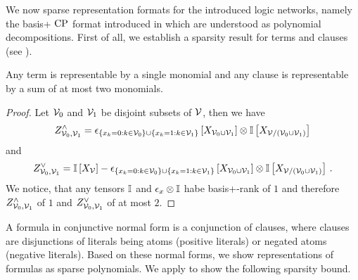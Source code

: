
We now sparse representation formats for the introduced logic networks, namely the basis+ $\mathrm{CP}$ format introduced in  which are understood as polynomial decompositions.
First of all, we establish a sparsity result for terms and clauses (see ).

\begin{lemma}\label{lem:clauseTermBasisPlus}
	Any term is representable by a single monomial and any clause is representable by a sum of at most two monomials. %
\end{lemma}
\begin{proof}
	Let $\mathcal{V}_0$ and $\mathcal{V}_1$ be disjoint subsets of $\mathcal{V}$, then we have
	\begin{align*}
		Z^{\land}_{\mathcal{V}_0,\mathcal{V}_1} = \epsilon_{
			\{x_{k} = 0 : k\in\mathcal{V}_0\} \cup \{x_{k} = 1 : k\in\mathcal{V}_1\}
		}\left[X_{\mathcal{V}_0\cup\mathcal{V}_1}\right] \otimes \mathbb{I}\left[X_{\mathcal{V}/(\mathcal{V}_0\cup\mathcal{V}_1)}\right]
	\end{align*}
	and
	\begin{align*}
		Z^{\lor}_{\mathcal{V}_0,\mathcal{V}_1} = \mathbb{I}\left[X_{\mathcal{V}}\right] - \epsilon_{
			\{x_{k} = 0 : k\in\mathcal{V}_0\} \cup \{x_{k} = 1 : k\in\mathcal{V}_1\}
		}\left[X_{\mathcal{V}_0\cup\mathcal{V}_1}\right]
		\otimes \mathbb{I}\left[X_{\mathcal{V}/(\mathcal{V}_0\cup\mathcal{V}_1)}\right] \, .
	\end{align*}
	We notice, that any tensors $\mathbb{I}$ and $\epsilon_{x}\otimes \mathbb{I}$ habe basis+-rank of $1$ and therefore $Z^{\land}_{\mathcal{V}_0,\mathcal{V}_1}$ of $1$ and $Z^{\lor}_{\mathcal{V}_0,\mathcal{V}_1}$ of at most $2$.
\end{proof}

A formula in conjunctive normal form is a conjunction of clauses, where clauses are disjunctions of literals being atoms (positive literals) or negated atoms (negative literals).
Based on these normal forms, we show representations of formulas as sparse polynomials. %
We apply  to show the following sparsity bound. %

